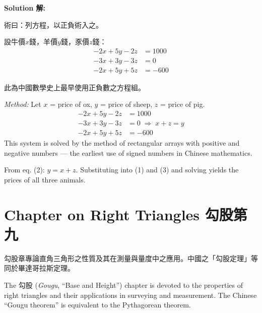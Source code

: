 \documentclass[11pt,a4paper]{article}
\newcommand{\zh}[1]{{\CJKfamily{\CJKrmdefault} #1}}
\newenvironment{chside}{%
  \begin{minipage}[t]{0.48\textwidth}%
  \setlength{\parindent}{1.5em}%
  \linespread{1.25}\selectfont%
  \small%
}{%
  \end{minipage}%
}
\newenvironment{enside}{%
  \hfill\begin{minipage}[t]{0.48\textwidth}%
  \setlength{\parindent}{1em}%
  \linespread{1.15}\selectfont%
  \small%
}{%
  \end{minipage}%
}
\newenvironment{solution}{%
  \par\medskip\noindent\textbf{\textcolor{notecolor}{Solution \zh{解}:}}\par\nopagebreak
  \small\setlength{\parindent}{1em}%
}{%
  \par\medskip%
}
\begin{document}
\begin{solution}
\noindent\begin{chside}
\zh{術曰：列方程，以正負術入之。}

設牛價$x$錢，羊價$y$錢，豕價$z$錢：
\begin{align*}
-2x + 5y - 2z &= 1000 \\
-3x + 3y - 3z &= 0 \\
-2x + 5y + 5z &= -600
\end{align*}

此為中國數學史上最早使用正負數之方程組。
\end{chside}%
\begin{enside}
\textit{Method:} Let $x$ = price of ox, $y$ = price of sheep, $z$ = price of
pig.
\begin{align*}
-2x + 5y - 2z &= 1000 \\
-3x + 3y - 3z &= 0 \;\Rightarrow\; x + z = y \\
-2x + 5y + 5z &= -600
\end{align*}
This system is solved by the method of rectangular arrays with positive and
negative numbers --- the earliest use of signed numbers in Chinese mathematics.

From eq. (2): $y = x + z$. Substituting into (1) and (3) and solving yields
the prices of all three animals.
\end{enside}
\end{solution}

\newpage

\section{Chapter on Right Triangles \zh{勾股第九}}
\label{sec:gougu}

\noindent\begin{chside}
\zh{勾股}章專論直角三角形之性質及其在測量與量度中之應用。中國之「勾股定理」等同於畢達哥拉斯定理。
\end{chside}%
\begin{enside}
The \zh{勾股} (\textit{Gougu}, ``Base and Height'') chapter is devoted to
the properties of right triangles and their applications in surveying and
measurement. The Chinese ``Gougu theorem'' is equivalent to the Pythagorean
theorem.
\end{enside}
\end{document}
